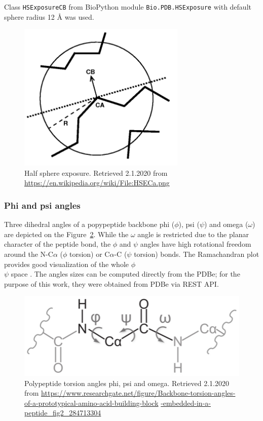 Class \texttt{HSExposureCB} from BioPython module \texttt{Bio.PDB.HSExposure} with default sphere radius 12 {\AA} was used. 

\begin{figure}[!h]\centering
\includegraphics[width=80mm]{../img/hse.png}
\caption[Half sphere exposure]{Half sphere exposure. Retrieved 2.1.2020 from \url{https://en.wikipedia.org/wiki/File:HSECa.png}}
\label{fig:hse}
\end{figure}


\subsubsection{Phi and psi angles}

Three dihedral angles of a popypeptide backbone phi ($\phi$), psi ($\psi$) and omega ($\omega$) are depicted on the Figure~\ref{fig:torsion}. While the $\omega$ angle is restricted due to the planar character of the peptide bond, the $\phi$ and $\psi$ angles have high rotational freedom around the N-C$\alpha$ ($\phi$ torsion) or C$\alpha$-C ($\psi$ torsion) bonds. The Ramachandran plot provides good visualization of the whole $\phi$\\$\psi$ space \cite{ramachandran}.
The angles sizes can be computed directly from the PDBe; for the purpose of this work, they were obtained from PDBe via REST API.

\begin{figure}[!h]\centering
\includegraphics[width=120mm]{../img/torsion.png}
\caption[Polypeptide torsion angles phi, psi and omega]{Polypeptide torsion angles phi, psi and omega. Retrieved 2.1.2020 from \url{https://www.researchgate.net/figure/Backbone-torsion-angles-of-a-prototypical-amino-acid-building-block}
\url{-embedded-in-a-peptide_fig2_284713304}}
\label{fig:torsion}
\end{figure}

